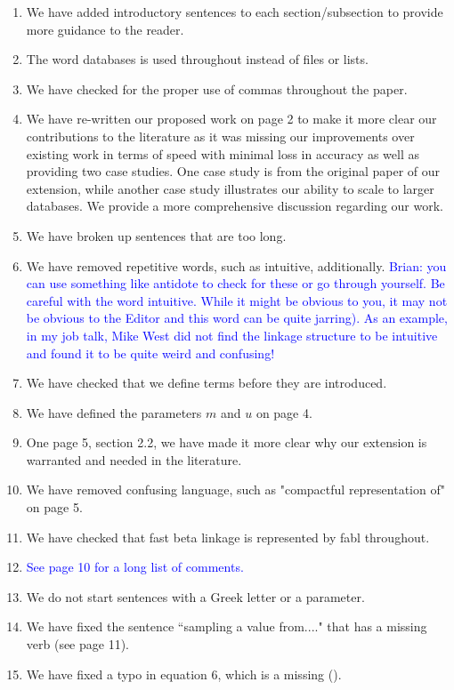 \documentclass[letterpaper, parskip]{scrartcl}
\begin{document}
\begin{enumerate}
\item We have added introductory sentences to each section/subsection to provide more guidance to the reader. 
\item The word databases is used throughout instead of files or lists. 
\item We have checked for the proper use of commas throughout the paper. 
\item We have re-written our proposed work on page 2 to make it more clear our contributions to the literature as it was missing our improvements over existing work in terms of speed with minimal loss in accuracy as well as providing two case studies. One case study is from the original paper of our extension, while another case study illustrates our ability to scale to larger databases. We provide a more comprehensive discussion regarding our work. 
\item We have broken up sentences that are too long.
\item We have removed repetitive words, such as intuitive, additionally.  \textcolor{blue}{Brian: you can use something like antidote to check for these or go through yourself. Be careful with the word intuitive. While it might be obvious to you, it may not be obvious to the Editor and this word can be quite jarring). As an example, in my job talk, Mike West did not find the linkage structure to be intuitive and found it to be quite weird and confusing!}
\item We have checked that we define terms before they are introduced. 
\item We have defined the parameters $m$ and $u$ on page 4. 
\item One page 5, section 2.2, we have made it more clear why our extension is warranted and needed in the literature. 
\item We have removed confusing language, such as "compactful representation of" on page 5. 
\item We have checked that fast beta linkage is represented by fabl throughout. 
\item \textcolor{blue}{See page 10 for a long list of comments.}
\item We do not start sentences with a Greek letter or a parameter.
\item We have fixed the sentence ``sampling a value from...." that has a missing verb (see page 11).
\item We have fixed a typo in equation 6, which is a missing (). 

\end{enumerate}
\end{document}
